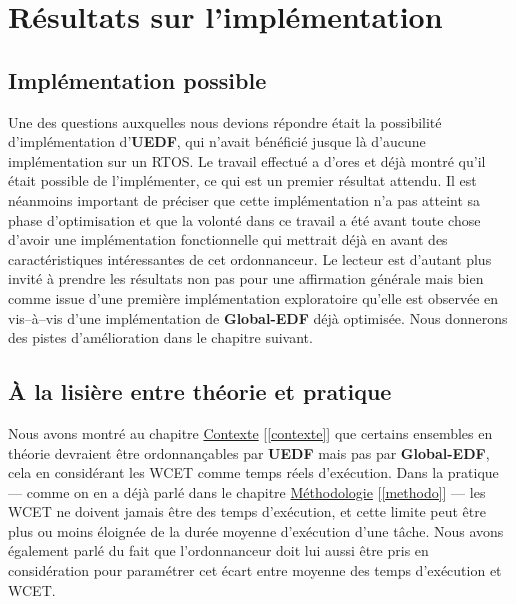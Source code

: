 
\section{Résultats sur l'implémentation}
\label{resultats}

	\subsection{Implémentation possible}
	
	Une des questions auxquelles nous devions répondre était la possibilité d'implémentation d'\textbf{UEDF}, qui 
	n'avait bénéficié jusque là d'aucune implémentation sur un RTOS.
	Le travail effectué a d'ores et déjà montré qu'il était possible de l'implémenter, ce qui est un premier résultat attendu.
	Il est néanmoins important de préciser que cette implémentation n'a pas atteint sa phase d'optimisation 
	et que la volonté dans ce travail a été avant toute chose d'avoir une implémentation fonctionnelle qui mettrait
	déjà en avant des caractéristiques intéressantes de cet ordonnanceur. 
	Le lecteur est d'autant plus invité à prendre les résultats non pas pour une affirmation générale 
	mais bien comme issue d'une première implémentation 
	\og{}exploratoire\fg{} qu'elle est observée en vis--à--vis d'une implémentation de \textbf{Global-EDF} déjà optimisée. 
	Nous donnerons des pistes d'amélioration dans le chapitre suivant. \newline
	
	\subsection{À la lisière entre théorie et pratique}
	
	Nous avons montré au chapitre \hyperref[contexte]{Contexte} [\ref*{contexte}] 
	que certains ensembles en théorie devraient être 
	ordonnançables par \textbf{UEDF }mais pas par\textbf{ Global-EDF}, cela en considérant les WCET comme 
	temps réels d'exécution. Dans la pratique --- comme on en a déjà parlé dans le chapitre \hyperref[methodo]{Méthodologie} [\ref*{methodo}] --- 
	les WCET ne doivent jamais être des temps d'exécution, et cette limite peut être plus ou moins éloignée 
	de la durée moyenne d'exécution d'une tâche. Nous avons également parlé du fait que l'ordonnanceur doit lui aussi
	être pris en considération pour paramétrer cet écart entre moyenne des temps d'exécution et WCET.\newline

